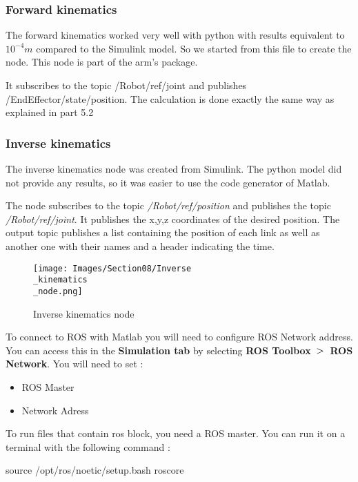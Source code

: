 \subsubsection{Forward kinematics}

The forward kinematics worked very well with python with results equivalent to $10^{-4}m$ compared to the Simulink model. So we started from this file to create the node. This node is part of the arm's package. 

\bigbreak
It subscribes to the topic /Robot/ref/joint and publishes /EndEffector/state/position. The calculation is done exactly the same way as explained in part 5.2

\subsubsection{Inverse kinematics}

The inverse kinematics node was created from Simulink. The python model did not provide any results, so it was easier to use the code generator of Matlab.

\bigbreak
The node subscribes to the topic \textit{/Robot/ref/position} and publishes the topic \textit{/Robot/ref/joint}. It publishes the x,y,z coordinates of the desired position. The output topic publishes a list containing the position of each link as well as another one with their names and a header indicating the time.
\bigbreak
\begin{figure}[ht]
    \centering
    \texttt{[image: Images/Section08/Inverse\\\_kinematics\\\_node.png]}
    \caption{Inverse kinematics node}
    \label{fig:InverseKinNode}
\end{figure}
\FloatBarrier

\bigbreak
To connect to ROS with Matlab you will need to configure ROS Network address. You can access this in the \textbf{Simulation tab} by selecting \textbf{ROS Toolbox} $\bg$ \textbf{ROS Network}. You will need to set :
\begin{multicols}{2}
    \begin{itemize}[noitemsep]
        \item ROS Master
        \item Network Adress
    \end{itemize}
\end{multicols}

\bigbreak
To run files that contain ros block, you need a ROS master. You can run it on a terminal with the following command :
\begin{commandshell}
    source /opt/ros/noetic/setup.bash
    roscore
\end{commandshell} 

